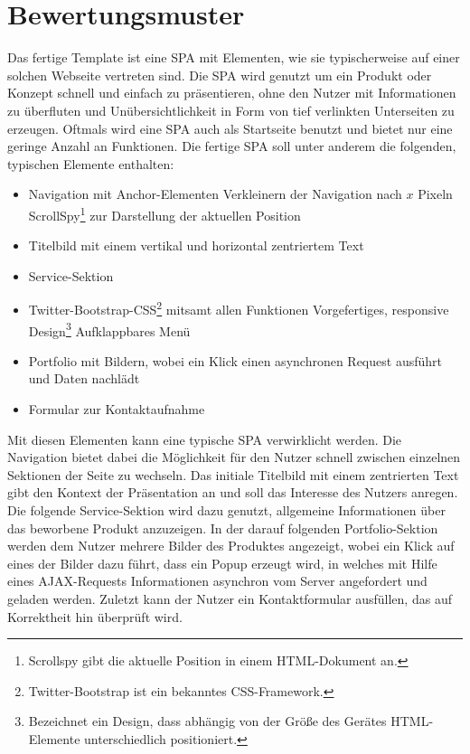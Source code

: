 \section{Bewertungsmuster}
\label{sec:Bewertungsmuster}
Das fertige Template ist eine \ac{SPA} mit Elementen, wie sie typischerweise auf einer solchen Webseite vertreten sind. Die \ac{SPA} wird genutzt um ein Produkt oder Konzept schnell und einfach zu präsentieren, ohne den Nutzer mit Informationen zu überfluten und Unübersichtlichkeit in Form von tief verlinkten Unterseiten zu erzeugen. Oftmals wird eine \ac{SPA} auch als Startseite benutzt und bietet nur eine geringe Anzahl an Funktionen.
Die fertige \ac{SPA} soll unter anderem die folgenden, typischen Elemente enthalten:
\begin{itemize}
	\item Navigation mit Anchor-Elementen
	\subitem{-} Verkleinern der Navigation nach $x$ Pixeln
	\subitem{-} ScrollSpy\footnote{Scrollspy gibt die aktuelle Position in einem \ac{HTML}-Dokument an.} zur Darstellung der aktuellen Position
	\item Titelbild mit einem vertikal und horizontal zentriertem Text
	\item Service-Sektion
	\item Twitter-Bootstrap-\ac{CSS}\footnote{Twitter-Bootstrap ist ein bekanntes \ac{CSS}-Framework.} mitsamt allen Funktionen
	\subitem{-} Vorgefertiges, responsive Design\footnote{Bezeichnet ein Design, dass abhängig von der Größe des Gerätes \ac{HTML}-Elemente unterschiedlich positioniert.}
	\subitem{-} Aufklappbares Menü
	\item Portfolio mit Bildern, wobei ein Klick einen asynchronen Request ausführt und Daten nachlädt
	\item Formular zur Kontaktaufnahme
\end{itemize}
Mit diesen Elementen kann eine typische \ac{SPA} verwirklicht werden. Die Navigation bietet dabei die Möglichkeit für den Nutzer schnell zwischen einzelnen Sektionen der Seite zu wechseln. Das initiale Titelbild mit einem zentrierten Text gibt den Kontext der Präsentation an und soll das Interesse des Nutzers anregen. Die folgende Service-Sektion wird dazu genutzt, allgemeine Informationen über das beworbene Produkt anzuzeigen. In der darauf folgenden Portfolio-Sektion werden dem Nutzer mehrere Bilder des Produktes angezeigt, wobei ein Klick auf eines der Bilder dazu führt, dass ein Popup erzeugt wird, in welches mit Hilfe eines AJAX-Requests Informationen asynchron vom Server angefordert und geladen werden. Zuletzt kann der Nutzer ein Kontaktformular ausfüllen, das auf Korrektheit hin überprüft wird.


